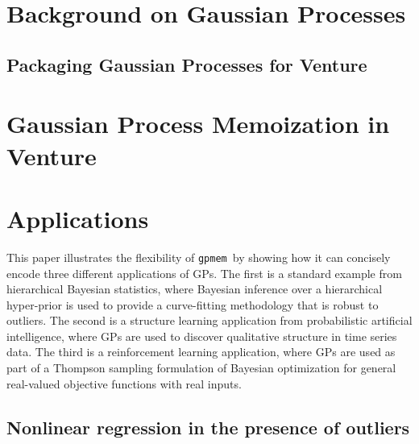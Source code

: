 \documentclass[twoside,11pt]{article}
\newcommand{\gpmem}{\texttt{gpmem}}
\begin{document}
%
\setcounter{figure}{0}
\section{Background on Gaussian Processes}


%
\subsection{Packaging Gaussian Processes for Venture}

\section{Gaussian Process Memoization in Venture}


\section{Applications}
This paper illustrates the flexibility of \gpmem\ by showing how it can concisely encode three different applications of \ac{GP}s.
The first is a standard example from hierarchical Bayesian statistics, where Bayesian inference over a hierarchical hyper-prior is used to provide a curve-fitting methodology that is robust to outliers.
The second is a structure learning application from probabilistic artificial intelligence, where \ac{GP}s are used to discover qualitative structure in time series data.
The third is a reinforcement learning application, where \ac{GP}s are used as part of a Thompson sampling formulation of Bayesian optimization for general real-valued objective functions with real inputs.

\subsection{Nonlinear regression in the presence of outliers}

%
\end{document}
